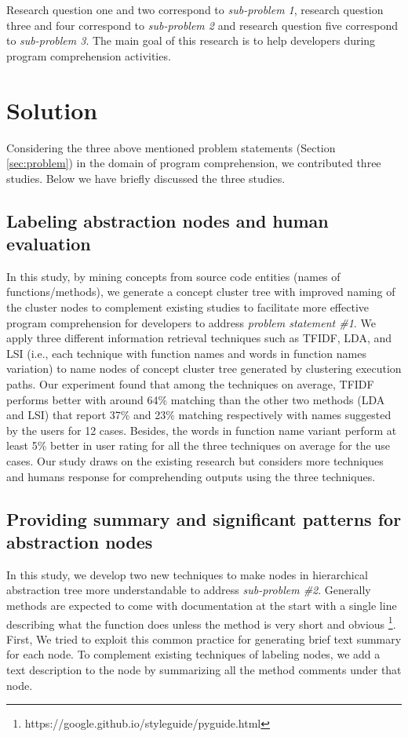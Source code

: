 Research question one and two correspond to \emph{sub-problem 1}, research question three and four correspond to \emph{sub-problem 2} and research question five correspond to \emph{sub-problem 3}. The main goal of this research is to help developers during program comprehension activities. 

\section{Solution}
Considering the three above mentioned problem statements (Section \ref{sec:problem}) in the domain of program comprehension, we contributed three studies. Below we have briefly discussed the three studies.  

\subsection{Labeling abstraction nodes and human evaluation}

In this study, by mining concepts from source code entities (names of functions/methods), we generate a concept cluster tree
with improved naming of the cluster nodes to complement existing studies to facilitate more effective program comprehension for
developers to address \emph{problem statement \#1}. We apply three different information retrieval techniques such as TFIDF, LDA, and LSI (i.e., each technique with function
names and words in function names variation) to name nodes of concept cluster tree generated by clustering execution paths. Our experiment found that among the techniques on average, TFIDF performs better with around 64\% matching than the other
two methods (LDA and LSI) that report 37\% and 23\% matching respectively with names suggested by the users for 12 cases. Besides,
the words in function name variant perform at least 5\% better in user rating for all the three techniques on average for the use cases.
Our study draws on the existing research but considers more techniques and humans response for comprehending outputs using the three
techniques.

\subsection{Providing summary and significant patterns for abstraction nodes}

In this study, we develop two new techniques to make nodes in hierarchical abstraction tree more understandable to address \emph{sub-problem \#2}. Generally methods are expected to come with documentation at the start with a single line describing what the function does unless the method is very short and obvious \footnote{https://google.github.io/styleguide/pyguide.html}. First, We tried to exploit this common practice for generating brief text summary for each node. 
To complement existing techniques of labeling nodes, we add a text description to the node by summarizing all the method comments under that node. 

